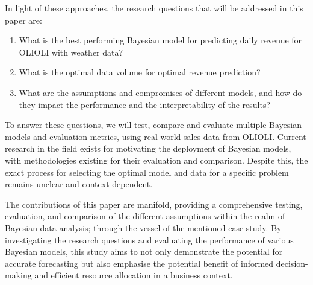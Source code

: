 In light of these approaches, the research questions that will be addressed in this paper are:

\begin{enumerate}
    \item What is the best performing Bayesian model for predicting daily revenue for OLIOLI with weather data?
    \item What is the optimal data volume for optimal revenue prediction?
    \item What are the assumptions and compromises of different models, and how do they impact the performance and the interpretability of the results?
\end{enumerate}


To answer these questions, we will test, compare and evaluate multiple Bayesian
models and evaluation metrics, using real-world sales data from OLIOLI. Current
research in the field exists for motivating the deployment of Bayesian models,
with methodologies existing for their evaluation and comparison. Despite this,
the exact process for selecting the optimal model and data for a specific
problem remains unclear and context-dependent.



The contributions of this paper are manifold, providing a comprehensive
testing, evaluation, and comparison of the different assumptions within the
realm of Bayesian data analysis; through the vessel of the mentioned case
study. By investigating the research questions and evaluating the performance
of various Bayesian models, this study aims to not only demonstrate the
potential for accurate forecasting but also emphasise the potential benefit of
informed decision-making and efficient resource allocation in a business
context.
